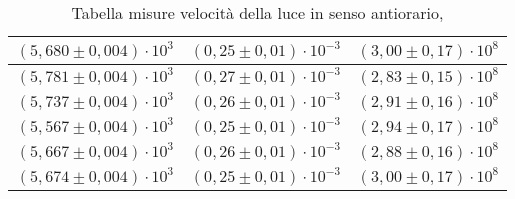 \begin{table}[H]
\begin{tabular}{|c|c|c|}
        \hline
        $ (5,680 \pm 0,004) \cdot 10^{3} $ & $ (0,25 \pm 0,01) \cdot 10^{-3} $ & $ (3,00 \pm 0,17) \cdot 10^{8} $\\
        \hline
        $ (5,781 \pm 0,004) \cdot 10^{3} $ & $ (0,27 \pm 0,01) \cdot 10^{-3} $ & $ (2,83 \pm 0,15) \cdot 10^{8} $\\
        \hline
        $ (5,737 \pm 0,004) \cdot 10^{3} $ & $ (0,26 \pm 0,01) \cdot 10^{-3} $ & $ (2,91 \pm 0,16) \cdot 10^{8} $\\
        \hline
        $ (5,567 \pm 0,004) \cdot 10^{3} $ & $ (0,25 \pm 0,01) \cdot 10^{-3} $ & $ (2,94 \pm 0,17) \cdot 10^{8} $\\
        \hline
        $ (5,667 \pm 0,004) \cdot 10^{3} $ & $ (0,26 \pm 0,01) \cdot 10^{-3} $ & $ (2,88 \pm 0,16) \cdot 10^{8} $\\
        \hline
        $ (5,674 \pm 0,004) \cdot 10^{3} $ & $ (0,25 \pm 0,01) \cdot 10^{-3} $ & $ (3,00 \pm 0,17) \cdot 10^{8} $\\
        \hline
        \end{tabular}
    \caption{Tabella misure velocità della luce in senso antiorario,}
\end{table}